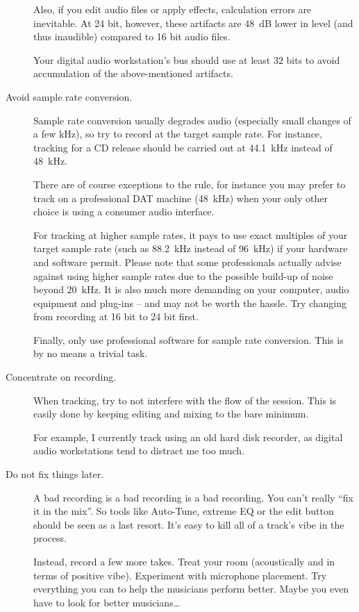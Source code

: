 \begin{description}
  Also, if you edit audio files or apply effects, calculation errors
  are inevitable.  At 24 bit, however, these artifacts are
  \SI{48}{\dB} lower in level (and thus inaudible) compared to 16 bit
  audio files.

  Your digital audio workstation's bus should use at least 32 bits to
  avoid accumulation of the above-mentioned artifacts.

\item[Avoid sample rate conversion.]  Sample rate conversion usually
  degrades audio (especially small changes of a few \si{\kilo\hertz}),
  so try to record at the target sample rate.  For instance, tracking
  for a CD release should be carried out at \SI{44.1}{\kilo\hertz}
  instead of \SI{48}{\kilo\hertz}.

  There are of course exceptions to the rule, for instance you may
  prefer to track on a professional DAT machine (\SI{48}{\kilo\hertz})
  when your only other choice is using a consumer audio interface.

  For tracking at higher sample rates, it pays to use exact multiples
  of your target sample rate (such as \SI{88.2}{\kilo\hertz} instead
  of \SI{96}{\kilo\hertz}) if your hardware and software permit.
  Please note that some professionals actually advise against using
  higher sample rates due to the possible build-up of noise beyond
  \SI{20}{\kilo\hertz}.  It is also much more demanding on your
  computer, audio equipment and plug-ins -- and may not be worth the
  hassle.  Try changing from recording at 16 bit to 24 bit first.

  Finally, only use professional software for sample rate conversion.
  This is by no means a trivial task.

\item[Concentrate on recording.]  When tracking, try to not interfere
  with the flow of the session.  This is easily done by keeping
  editing and mixing to the bare minimum.

  For example, I currently track using an old hard disk recorder, as
  digital audio workstations tend to distract me too much.

\item[Do not fix things later.]  A bad recording is a bad recording is
  a bad recording.  You can't really ``fix it in the mix''.  So tools
  like Auto-Tune, extreme EQ or the edit button should be seen as a
  last resort.  It's easy to kill all of a track's vibe in the
  process.

  Instead, record a few more takes.  Treat your room (acoustically and
  in terms of positive vibe).  Experiment with microphone placement.
  Try everything you can to help the musicians perform better.  Maybe
  you even have to look for better musicians\dots

\end{description}

